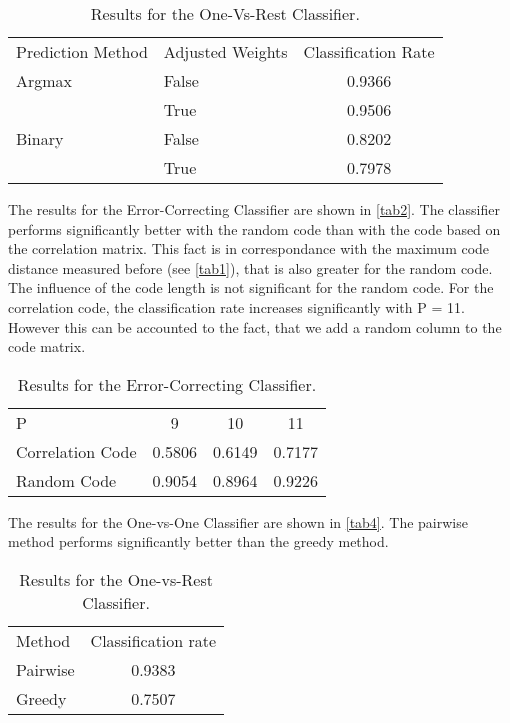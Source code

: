 \documentclass{article}
\begin{document}
\begin{table}[h]
	\centering
	\begin{tabular}{l l c}
        Prediction Method   & Adjusted Weights  & Classification Rate   \\
        Argmax	            & False             &   0.9366 		        \\
                            & True              &   0.9506              \\
        Binary	            & False             &	0.8202              \\
                            & True              &   0.7978              \\
	\end{tabular}
	\caption{Results for the One-Vs-Rest Classifier.}
	\label{tab2}
\end{table}

The results for the Error-Correcting Classifier are shown in \autoref{tab2}.
The classifier performs significantly better with the random code than with the
code based on the correlation matrix.
This fact is in correspondance with the maximum code distance measured before 
(see \autoref{tab1}), that is also greater for the random code.
The influence of the code length is not significant for the random code.
For the correlation code, the classification rate increases significantly with P = 11.
However this can be accounted to the fact, that we add a random column to the code matrix.

\begin{table}[h]
	\centering
	\begin{tabular}{l c c c}
        P                   & 9     & 10    & 11    \\
        Correlation Code	& 0.5806&0.6149 &0.7177 \\         
        Random Code	        & 0.9054&0.8964 &0.9226 \\	
    \end{tabular}
	\caption{Results for the Error-Correcting Classifier.}
	\label{tab3}
\end{table}

The results for the One-vs-One Classifier are shown in \autoref{tab4}.
The pairwise method performs significantly better than the greedy method.

\begin{table}[h]
	\centering
	\begin{tabular}{l c}
        Method      &  Classification rate   \\
        Pairwise    &  0.9383    		     \\
        Greedy      &  0.7507                \\
	\end{tabular}
	\caption{Results for the One-vs-Rest Classifier.}
	\label{tab4}
\end{table}
\end{document}
